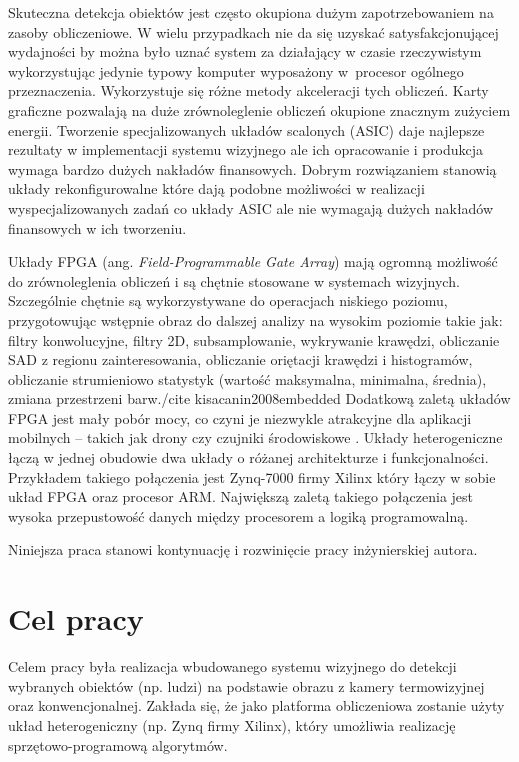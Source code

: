 Skuteczna detekcja obiektów jest często okupiona dużym zapotrzebowaniem na zasoby obliczeniowe. W wielu przypadkach nie da się uzyskać satysfakcjonującej wydajności by można było uznać system za działający w czasie rzeczywistym wykorzystując jedynie typowy komputer wyposażony w~procesor ogólnego przeznaczenia. Wykorzystuje się różne metody akceleracji tych obliczeń. Karty graficzne pozwalają na duże zrównoleglenie obliczeń okupione znacznym zużyciem energii. Tworzenie specjalizowanych układów scalonych (ASIC) daje najlepsze rezultaty w implementacji systemu wizyjnego ale ich opracowanie i produkcja wymaga bardzo dużych nakładów finansowych. Dobrym rozwiązaniem stanowią układy rekonfigurowalne które dają podobne możliwości w realizacji wyspecjalizowanych zadań co układy ASIC ale nie wymagają dużych nakładów finansowych w ich tworzeniu.

Układy FPGA (ang. \textit{Field-Programmable Gate Array}) mają ogromną możliwość do zrównoleglenia obliczeń i są chętnie stosowane w systemach wizyjnych. Szczególnie chętnie są wykorzystywane do operacjach niskiego poziomu, przygotowując wstępnie obraz do dalszej analizy na wysokim poziomie takie jak: filtry konwolucyjne, filtry 2D, subsamplowanie, wykrywanie krawędzi, obliczanie SAD z regionu zainteresowania, obliczanie oriętacji krawędzi i histogramów, obliczanie strumieniowo statystyk (wartość maksymalna, minimalna, średnia), zmiana przestrzeni barw./cite{ kisacanin2008embedded}
Dodatkową zaletą układów FPGA jest mały pobór mocy, co czyni je niezwykle atrakcyjne dla aplikacji mobilnych -- takich jak drony czy czujniki środowiskowe \cite{garcia2014survey}. 
Układy heterogeniczne łączą w jednej obudowie dwa układy o różanej architekturze i funkcjonalności. Przykładem takiego połączenia jest Zynq-7000 firmy Xilinx który łączy w sobie układ FPGA oraz procesor ARM. Największą zaletą takiego połączenia jest wysoka przepustowość danych między procesorem a logiką programowalną. 

Niniejsza praca stanowi kontynuację i rozwinięcie pracy inżynierskiej autora.

\section{Cel pracy}


Celem pracy była realizacja wbudowanego systemu wizyjnego do detekcji wybranych obiektów (np. ludzi) na podstawie obrazu z kamery termowizyjnej oraz konwencjonalnej. 
Zakłada się, że jako platforma obliczeniowa zostanie użyty układ heterogeniczny (np. Zynq firmy Xilinx), który umożliwia realizację sprzętowo-programową algorytmów.

